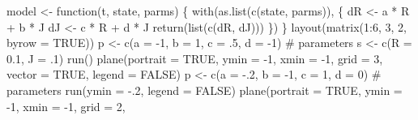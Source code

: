 \documentclass[
  a4paper,
  DIV=11,
  numbers=noendperiod,
  oneside]{scrreprt}
\newenvironment{Shaded}{}{}
\newcommand{\AttributeTok}[1]{\textcolor[rgb]{0.84,0.23,0.29}{#1}}
\newcommand{\CommentTok}[1]{\textcolor[rgb]{0.42,0.45,0.49}{#1}}
\newcommand{\ConstantTok}[1]{\textcolor[rgb]{0.00,0.36,0.77}{#1}}
\newcommand{\ControlFlowTok}[1]{\textcolor[rgb]{0.84,0.23,0.29}{#1}}
\newcommand{\DecValTok}[1]{\textcolor[rgb]{0.00,0.36,0.77}{#1}}
\newcommand{\FloatTok}[1]{\textcolor[rgb]{0.00,0.36,0.77}{#1}}
\newcommand{\FunctionTok}[1]{\textcolor[rgb]{0.44,0.26,0.76}{#1}}
\newcommand{\NormalTok}[1]{\textcolor[rgb]{0.14,0.16,0.18}{#1}}
\newcommand{\OtherTok}[1]{\textcolor[rgb]{0.44,0.26,0.76}{#1}}
\newcommand{\SpecialCharTok}[1]{\textcolor[rgb]{0.00,0.36,0.77}{#1}}
\begin{document}
\begin{Shaded}
\begin{Highlighting}[]
\NormalTok{model }\OtherTok{\textless{}{-}} \ControlFlowTok{function}\NormalTok{(t, state, parms) \{}
  \FunctionTok{with}\NormalTok{(}\FunctionTok{as.list}\NormalTok{(}\FunctionTok{c}\NormalTok{(state, parms)), \{}
\NormalTok{    dR }\OtherTok{\textless{}{-}}\NormalTok{ a }\SpecialCharTok{*}\NormalTok{ R }\SpecialCharTok{+}\NormalTok{ b }\SpecialCharTok{*}\NormalTok{ J}
\NormalTok{    dJ }\OtherTok{\textless{}{-}}\NormalTok{ c }\SpecialCharTok{*}\NormalTok{ R }\SpecialCharTok{+}\NormalTok{ d }\SpecialCharTok{*}\NormalTok{ J}
    \FunctionTok{return}\NormalTok{(}\FunctionTok{list}\NormalTok{(}\FunctionTok{c}\NormalTok{(dR, dJ)))}
\NormalTok{  \})}
\NormalTok{\}}
\FunctionTok{layout}\NormalTok{(}\FunctionTok{matrix}\NormalTok{(}\DecValTok{1}\SpecialCharTok{:}\DecValTok{6}\NormalTok{, }\DecValTok{3}\NormalTok{, }\DecValTok{2}\NormalTok{, }\AttributeTok{byrow =} \ConstantTok{TRUE}\NormalTok{))}
\NormalTok{p }\OtherTok{\textless{}{-}} \FunctionTok{c}\NormalTok{(}\AttributeTok{a =} \SpecialCharTok{{-}}\DecValTok{1}\NormalTok{, }\AttributeTok{b =} \DecValTok{1}\NormalTok{, }\AttributeTok{c =}\NormalTok{ .}\DecValTok{5}\NormalTok{, }\AttributeTok{d =} \SpecialCharTok{{-}}\DecValTok{1}\NormalTok{) }\CommentTok{\# parameters}
\NormalTok{s }\OtherTok{\textless{}{-}} \FunctionTok{c}\NormalTok{(}\AttributeTok{R =} \FloatTok{0.1}\NormalTok{, }\AttributeTok{J =}\NormalTok{ .}\DecValTok{1}\NormalTok{) }
\FunctionTok{run}\NormalTok{()}
\FunctionTok{plane}\NormalTok{(}\AttributeTok{portrait =} \ConstantTok{TRUE}\NormalTok{, }\AttributeTok{ymin =} \SpecialCharTok{{-}}\DecValTok{1}\NormalTok{, }\AttributeTok{xmin =} \SpecialCharTok{{-}}\DecValTok{1}\NormalTok{, }\AttributeTok{grid =} \DecValTok{3}\NormalTok{,}
      \AttributeTok{vector =} \ConstantTok{TRUE}\NormalTok{, }\AttributeTok{legend =} \ConstantTok{FALSE}\NormalTok{)}
\NormalTok{p }\OtherTok{\textless{}{-}} \FunctionTok{c}\NormalTok{(}\AttributeTok{a =} \SpecialCharTok{{-}}\NormalTok{.}\DecValTok{2}\NormalTok{, }\AttributeTok{b =} \SpecialCharTok{{-}}\DecValTok{1}\NormalTok{, }\AttributeTok{c =} \DecValTok{1}\NormalTok{, }\AttributeTok{d =} \DecValTok{0}\NormalTok{) }\CommentTok{\# parameters}
\FunctionTok{run}\NormalTok{(}\AttributeTok{ymin =} \SpecialCharTok{{-}}\NormalTok{.}\DecValTok{2}\NormalTok{, }\AttributeTok{legend =} \ConstantTok{FALSE}\NormalTok{)}
\FunctionTok{plane}\NormalTok{(}\AttributeTok{portrait =} \ConstantTok{TRUE}\NormalTok{, }\AttributeTok{ymin =} \SpecialCharTok{{-}}\DecValTok{1}\NormalTok{, }\AttributeTok{xmin =} \SpecialCharTok{{-}}\DecValTok{1}\NormalTok{, }\AttributeTok{grid =} \DecValTok{2}\NormalTok{,}

\end{Highlighting}
\end{Shaded}
\end{document}
